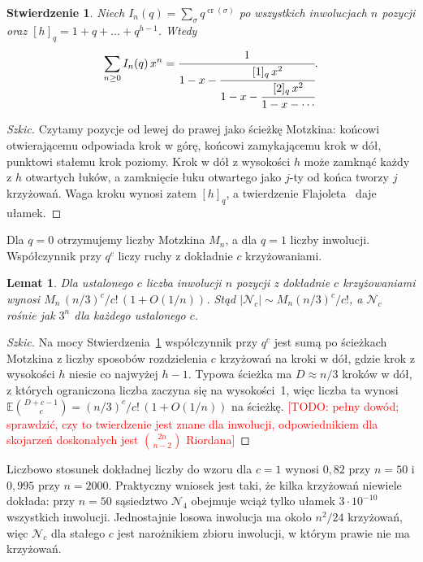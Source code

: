 \documentclass[10pt,twocolumn]{article}
\newtheorem{proposition}{Stwierdzenie}
\newtheorem{lemma}{Lemat}
\newcommand{\todo}[1]{\textcolor{red}{[TODO: #1]}}
\newcommand{\N}{\mathcal{N}}
\newcommand{\ncr}{\operatorname{cr}}
\begin{document}
\begin{proposition}\label{prop:jfrac}
Niech $I_n(q)=\sum_{\sigma}q^{\ncr(\sigma)}$ po wszystkich inwolucjach
$n$ pozycji oraz $[h]_q=1+q+\dots+q^{h-1}$. Wtedy
\begin{equation}
\sum_{n\geq0} I_n(q)\,x^n=
\cfrac{1}{1-x-\cfrac{[1]_q\,x^2}{1-x-\cfrac{[2]_q\,x^2}{1-x-\cdots}}}.
\end{equation}
\end{proposition}
\begin{proof}[Szkic]
Czytamy pozycje od lewej do prawej jako ścieżkę Motzkina: końcowi
otwierającemu odpowiada krok w górę, końcowi zamykającemu krok w dół,
punktowi stałemu krok poziomy. Krok w dół z wysokości $h$ może zamknąć
każdy z $h$ otwartych łuków, a zamknięcie łuku otwartego jako $j$-ty od
końca tworzy $j$ krzyżowań. Waga kroku wynosi zatem $[h]_q$,
a twierdzenie Flajoleta~\cite{flajolet1980} daje ułamek.
\end{proof}

Dla $q=0$ otrzymujemy liczby Motzkina $M_n$, a dla $q=1$ liczby inwolucji.
Współczynnik przy $q^c$ liczy ruchy z dokładnie $c$ krzyżowaniami.

\begin{lemma}\label{lem:poisson}
Dla ustalonego $c$ liczba inwolucji $n$ pozycji z dokładnie $c$
krzyżowaniami wynosi $M_n\,(n/3)^c/c!\,(1+O(1/n))$. Stąd
$|\N_c|\sim M_n(n/3)^c/c!$, a $\N_c$ rośnie jak $3^n$ dla każdego
ustalonego $c$.
\end{lemma}
\begin{proof}[Szkic]
Na mocy Stwierdzenia~\ref{prop:jfrac} współczynnik przy $q^c$ jest sumą
po ścieżkach Motzkina z liczby sposobów rozdzielenia $c$ krzyżowań na
kroki w dół, gdzie krok z wysokości $h$ niesie co najwyżej $h-1$.
Typowa ścieżka ma $D\approx n/3$ kroków w dół, z których ograniczona
liczba zaczyna się na wysokości~1, więc liczba ta wynosi
$\mathbb{E}\binom{D+c-1}{c}=(n/3)^c/c!\,(1+O(1/n))$ na ścieżkę.
\todo{pełny dowód; sprawdzić, czy to twierdzenie jest znane dla inwolucji,
odpowiednikiem dla skojarzeń doskonałych jest $\binom{2n}{n-2}$ Riordana}
\end{proof}

Liczbowo stosunek dokładnej liczby do wzoru dla $c=1$ wynosi $0{,}82$ przy
$n=50$ i $0{,}995$ przy $n=2000$. Praktyczny wniosek jest taki, że kilka
krzyżowań niewiele dokłada: przy $n=50$ sąsiedztwo $\N_4$ obejmuje wciąż
tylko ułamek $3\cdot10^{-10}$ wszystkich inwolucji. Jednostajnie losowa
inwolucja ma około $n^2/24$ krzyżowań, więc $\N_c$ dla stałego $c$ jest
narożnikiem zbioru inwolucji, w którym prawie nie ma krzyżowań.
\end{document}

